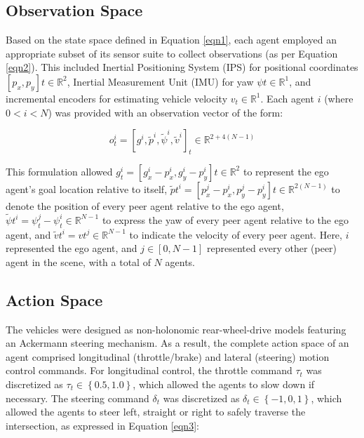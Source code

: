 \documentclass[letterpaper, 10 pt, conference]{ieeeconf}  %
\begin{document}
	\subsection{Observation Space}
	\label{Sub-Section: Observation Space I}
	
	Based on the state space defined in Equation \ref{eqn1}, each agent employed an appropriate subset of its sensor suite to collect observations (as per Equation \ref{eqn2}). This included Inertial Positioning System (IPS) for positional coordinates $\left [ p_{x}, p_{y} \right ]{t} \in \mathbb{R}^{2}$, Inertial Measurement Unit (IMU) for yaw $\psi{t} \in \mathbb{R}^{1}$, and incremental encoders for estimating vehicle velocity $v_{t} \in \mathbb{R}^{1}$. Each agent $i$ (where $0<i<N$) was provided with an observation vector of the form:
	
	\begin{equation}
	\label{eqn2}
	o_{t}^{i} = \left [ g^{i}, \tilde{p}^{i}, \tilde{\psi}^{i}, \tilde{v}^{i} \right ]_{t} \in \mathbb{R}^{2+4(N-1)}
	\end{equation}
	
	This formulation allowed $g_{t}^{i} = \left [ g_{x}^{i}-p_{x}^{i}, g_{y}^{i}-p_{y}^{i} \right ]{t} \in \mathbb{R}^{2}$ to represent the ego agent's goal location relative to itself, $\tilde{p}{t}^{i} = \left [ p_{x}^{j}-p_{x}^{i}, p_{y}^{j}-p_{y}^{i} \right ]{t} \in \mathbb{R}^{2(N-1)}$ to denote the position of every peer agent relative to the ego agent, $\tilde{\psi}{t}^{i} = \psi_{t}^{j}-\psi_{t}^{i} \in \mathbb{R}^{N-1}$ to express the yaw of every peer agent relative to the ego agent, and $\tilde{v}{t}^{i} = v{t}^{j} \in \mathbb{R}^{N-1}$ to indicate the velocity of every peer agent. Here, $i$ represented the ego agent, and $j \in \left [ 0, N-1 \right ]$ represented every other (peer) agent in the scene, with a total of $N$ agents. 
	
	\subsection{Action Space}
	\label{Sub-Section: Action Space I}
	
	The vehicles were designed as non-holonomic rear-wheel-drive models featuring an Ackermann steering mechanism. As a result, the complete action space of an agent comprised longitudinal (throttle/brake) and lateral (steering) motion control commands. For longitudinal control, the throttle command $\tau_t$ was discretized as $\tau_t \in \left \{ 0.5, 1.0 \right \}$, which allowed the agents to slow down if necessary. The steering command $\delta_t$ was discretized as $\delta_t \in \left \{ -1, 0, 1 \right \}$, which allowed the agents to steer left, straight or right to safely traverse the intersection, as expressed in Equation \ref{eqn3}:
	
\end{document}
